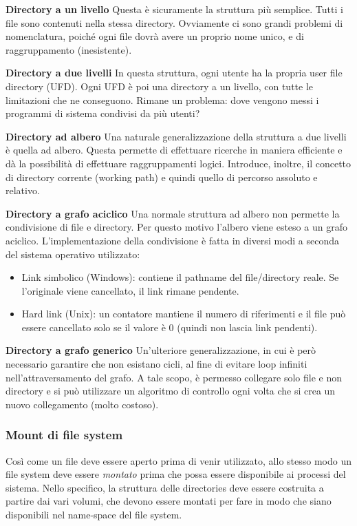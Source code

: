 \documentclass[a4paper]{article}
\begin{document}
\textbf{Directory a un livello}\newline
Questa è sicuramente la struttura più semplice. Tutti i file sono contenuti nella stessa directory. Ovviamente ci sono grandi problemi di nomenclatura, poiché ogni file dovrà avere un proprio nome unico, e di raggruppamento (inesistente).
\newline

\textbf{Directory a due livelli}\newline
In questa struttura, ogni utente ha la propria user file directory (UFD). Ogni UFD è poi una directory a un livello, con tutte le limitazioni che ne conseguono. Rimane un problema: dove vengono messi i programmi di sistema condivisi da più utenti?
\newline

\textbf{Directory ad albero}\newline
Una naturale generalizzazione della struttura a due livelli è quella ad albero. Questa permette di effettuare ricerche in maniera efficiente e dà la possibilità di effettuare raggruppamenti logici. Introduce, inoltre, il concetto di directory corrente (working path) e quindi quello di percorso assoluto e relativo.
\newline

\textbf{Directory a grafo aciclico}
Una normale struttura ad albero non permette la condivisione di file e directory. Per questo motivo l'albero viene esteso a un grafo aciclico. L'implementazione della condivisione è fatta in diversi modi a seconda del sistema operativo utilizzato:
\begin{itemize}
    \item Link simbolico (Windows): contiene il pathname del file/directory reale. Se l'originale viene cancellato, il link rimane pendente.
    \item Hard link (Unix): un contatore mantiene il numero di riferimenti e il file può essere cancellato solo se il valore è 0 (quindi non lascia link pendenti).
\end{itemize}

\textbf{Directory a grafo generico}
Un'ulteriore generalizzazione, in cui è però necessario garantire che non esistano cicli, al fine di evitare loop infiniti nell'attraversamento del grafo. A tale scopo, è permesso collegare solo file e non directory e si può utilizzare un algoritmo di controllo ogni volta che si crea un nuovo collegamento (molto costoso).

\subsubsection{Mount di file system}
Così come un file deve essere aperto prima di venir utilizzato, allo stesso modo un file system deve essere \textit{montato} prima che possa essere disponibile ai processi del sistema. Nello specifico, la struttura delle directories deve essere costruita a partire dai vari volumi, che devono essere montati per fare in modo che siano disponibili nel name-space del file system.
\end{document}
